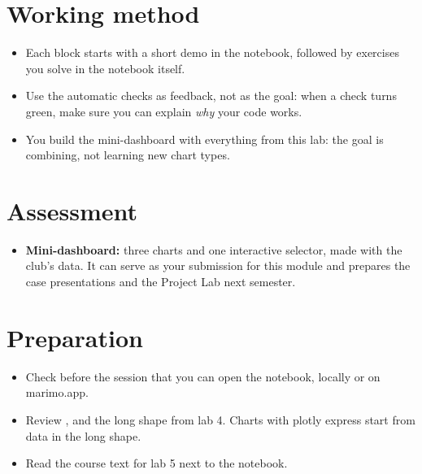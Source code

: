 \documentclass[11pt,a4paper]{article}
\begin{document}
\section{Working method}

\begin{itemize}
  \item Each block starts with a short demo in the notebook, followed by
        exercises you solve in the notebook itself.
  \item Use the automatic checks as feedback, not as the goal: when a
        check turns green, make sure you can explain \emph{why} your code
        works.
  \item You build the mini-dashboard with everything from this lab: the
        goal is combining, not learning new chart types.
\end{itemize}

\section{Assessment}

\begin{itemize}
  \item \textbf{Mini-dashboard:} three charts and one interactive
        selector, made with the club's data. It can serve as your
        submission for this module and prepares the case presentations
        and the Project Lab next semester.
\end{itemize}

\section{Preparation}

\begin{itemize}
  \item Check before the session that you can open the notebook, locally
        or on marimo.app.
  \item Review ,  and the long shape from lab 4.
        Charts with plotly express start from data in the long shape.
  \item Read the course text for lab 5 next to the notebook.
\end{itemize}
\end{document}

